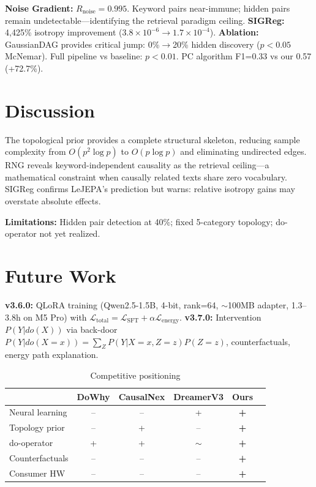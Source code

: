 \documentclass[10pt,twocolumn]{article}
\begin{document}
\textbf{Noise Gradient:} $R_{\text{noise}}=0.995$. Keyword pairs near-immune; hidden pairs remain undetectable---identifying the retrieval paradigm ceiling. \textbf{SIGReg:} 4,425\% isotropy improvement ($3.8\times10^{-6}\to1.7\times10^{-4}$). \textbf{Ablation:} GaussianDAG provides critical jump: 0\%$\to$20\% hidden discovery ($p<0.05$ McNemar). Full pipeline vs baseline: $p<0.01$. PC algorithm F1=0.33 vs our 0.57 (+72.7\%).

\section{Discussion}

The topological prior provides a complete structural skeleton, reducing sample complexity from $O(p^2\log p)$ to $O(p\log p)$ and eliminating undirected edges. RNG reveals keyword-independent causality as the retrieval ceiling---a mathematical constraint when causally related texts share zero vocabulary. SIGReg confirms LeJEPA's prediction but warns: relative isotropy gains may overstate absolute effects.

\textbf{Limitations:} Hidden pair detection at 40\%; fixed 5-category topology; do-operator not yet realized.

\section{Future Work}

\textbf{v3.6.0:} QLoRA training (Qwen2.5-1.5B, 4-bit, rank=64, $\sim$100MB adapter, 1.3--3.8h on M5 Pro) with $\mathcal{L}_{\text{total}}=\mathcal{L}_{\text{SFT}}+\alpha\mathcal{L}_{\text{energy}}$. \textbf{v3.7.0:} Intervention $P(Y|do(X))$ via back-door $P(Y|do(X=x))=\sum_Z P(Y|X=x,Z=z)P(Z=z)$, counterfactuals, energy path explanation.

\begin{table}[H]
\centering\small\caption{Competitive positioning}
\begin{tabular}{lccccc}
\toprule
& DoWhy & CausalNex & DreamerV3 & \textbf{Ours} \\
\midrule
Neural learning   & -- & -- & + & \textbf{+} \\
Topology prior    & -- & + & -- & \textbf{+} \\
do-operator       & + & + & $\sim$ & \textbf{+} \\
Counterfactuals   & -- & -- & -- & \textbf{+} \\
Consumer HW       & -- & -- & -- & \textbf{+} \\
\bottomrule
\end{tabular}
\end{table}
\end{document}
